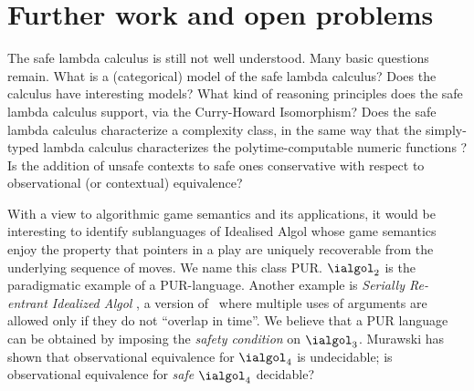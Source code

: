 
\section{Further work and open problems}

The safe lambda calculus is still not well understood. Many basic
questions remain. What is a (categorical) model of the safe lambda
calculus? Does the calculus have interesting models?  What kind of
reasoning principles does the safe lambda calculus support, via the
Curry-Howard Isomorphism? Does the safe lambda calculus characterize
a complexity class, in the same way that the simply-typed lambda
calculus characterizes the polytime-computable numeric functions
\cite{DBLP:conf/tlca/LeivantM93}?  Is the addition of unsafe contexts to safe ones
conservative with respect to observational (or contextual)
equivalence?

With a view to algorithmic game semantics and its applications, it
would be interesting to identify sublanguages of Idealised Algol
whose game semantics enjoy the property that pointers in a play are
uniquely recoverable from the underlying sequence of moves. We name
this class PUR. $\ialgol_2$ is the paradigmatic example of a
PUR-language. Another example is \emph{Serially Re-entrant Idealized
  Algol} \cite{abramsky:mchecking_ia}, a version of \ialgol\ where
multiple uses of arguments are allowed only if they do not ``overlap
in time''.  We believe that a PUR language can be obtained by
imposing the \emph{safety condition} on $\ialgol_3$. Murawski
\cite{Murawski2003} has shown that observational equivalence for
$\ialgol_4$ is undecidable; is observational equivalence for
\emph{safe} $\ialgol_4$ decidable?
